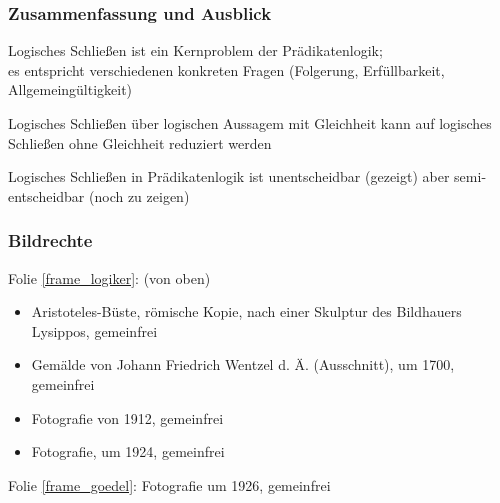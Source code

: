 \documentclass[onlymath]{beamer}
\begin{document}
\begin{frame}\frametitle{Zusammenfassung und Ausblick}

Logisches Schließen ist ein Kernproblem der Prädikatenlogik;\\
es entspricht verschiedenen konkreten Fragen (Folgerung, Erfüllbarkeit, Allgemeingültigkeit)
\bigskip

Logisches Schließen über logischen Aussagem mit Gleichheit kann
auf logisches Schließen ohne Gleichheit reduziert werden\bigskip

Logisches Schließen in Prädikatenlogik ist unentscheidbar (gezeigt)
aber semi-entscheidbar (noch zu zeigen)


\end{frame}




\begin{frame}[t]\frametitle{Bildrechte}

Folie \ref{frame_logiker}: (von oben)
\begin{itemize}
\item Aristoteles-Büste, römische Kopie, nach einer Skulptur des Bildhauers Lysippos, gemeinfrei
\item Gemälde von Johann Friedrich Wentzel d. Ä. (Ausschnitt), um 1700, gemeinfrei
\item Fotografie von 1912, gemeinfrei
\item Fotografie, um 1924, gemeinfrei
\end{itemize}
Folie \ref{frame_goedel}: Fotografie um 1926, gemeinfrei

\end{frame}
\end{document}
